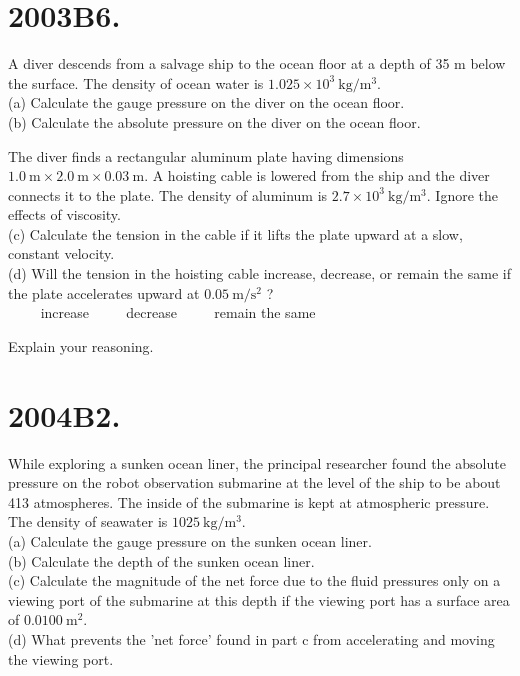 \begin{enumerate}
\section*{2003B6.}
A diver descends from a salvage ship to the ocean floor at a depth of 35 m below the surface. The density of ocean water is $1.025 \times 10^{3} \mathrm{~kg} / \mathrm{m}^{3}$.\\
(a) Calculate the gauge pressure on the diver on the ocean floor.\\
(b) Calculate the absolute pressure on the diver on the ocean floor.

The diver finds a rectangular aluminum plate having dimensions $1.0 \mathrm{~m} \times 2.0 \mathrm{~m} \times 0.03 \mathrm{~m}$. A hoisting cable is lowered from the ship and the diver connects it to the plate. The density of aluminum is $2.7 \times 10^{3} \mathrm{~kg} / \mathrm{m}^{3}$. Ignore the effects of viscosity.\\
(c) Calculate the tension in the cable if it lifts the plate upward at a slow, constant velocity.\\
(d) Will the tension in the hoisting cable increase, decrease, or remain the same if the plate accelerates upward at $0.05 \mathrm{~m} / \mathrm{s}^{2}$ ?\\
$\qquad$ increase $\qquad$ decrease $\qquad$ remain the same

Explain your reasoning.

\section*{2004B2.}
While exploring a sunken ocean liner, the principal researcher found the absolute pressure on the robot observation submarine at the level of the ship to be about 413 atmospheres. The inside of the submarine is kept at atmospheric pressure. The density of seawater is $1025 \mathrm{~kg} / \mathrm{m}^{3}$.\\
(a) Calculate the gauge pressure on the sunken ocean liner.\\
(b) Calculate the depth of the sunken ocean liner.\\
(c) Calculate the magnitude of the net force due to the fluid pressures only on a viewing port of the submarine at this depth if the viewing port has a surface area of $0.0100 \mathrm{~m}^{2}$.\\
(d) What prevents the 'net force' found in part c from accelerating and moving the viewing port.


\end{enumerate}
